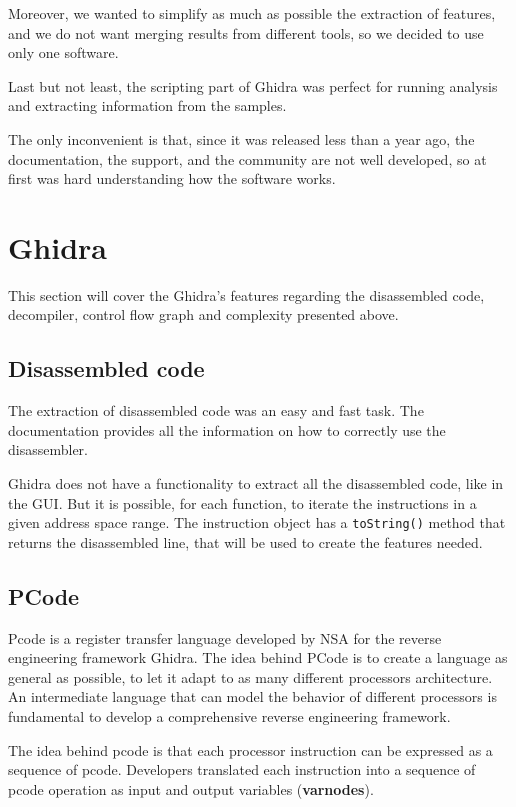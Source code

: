 Moreover, we wanted to simplify as much as possible the extraction of features, and we do not want merging results from different tools, so we decided to use only one software. 

Last but not least, the scripting part of Ghidra was perfect for running analysis and extracting information from the samples. 

The only inconvenient is that, since it was released less than a year ago, the documentation, the support, and the community are not well developed, so at first was hard understanding how the software works.
\section{Ghidra}

This section will cover the Ghidra's features regarding the disassembled code, decompiler, control flow graph and complexity presented above.
 


\subsection{Disassembled code}

The extraction of disassembled code was an easy and fast task. The documentation provides all the information on how to correctly use the disassembler. 

Ghidra does not have a functionality to extract all the disassembled code, like in the GUI. But it is possible, for each function, to iterate the instructions in a given address space range. The instruction object has a \texttt{toString()} method that returns the disassembled line, that will be used to create the features needed.

\subsection{PCode}
Pcode is a register transfer language developed by NSA for the reverse engineering framework Ghidra. The idea behind PCode is to create a language as general as possible, to let it adapt to as many different processors architecture. An intermediate language that can model the behavior of different processors is fundamental to develop a comprehensive reverse engineering framework.

The idea behind pcode is that each processor instruction can be expressed as a sequence of pcode. Developers translated each instruction into a sequence of pcode operation as input and output variables (\textbf{varnodes}).

